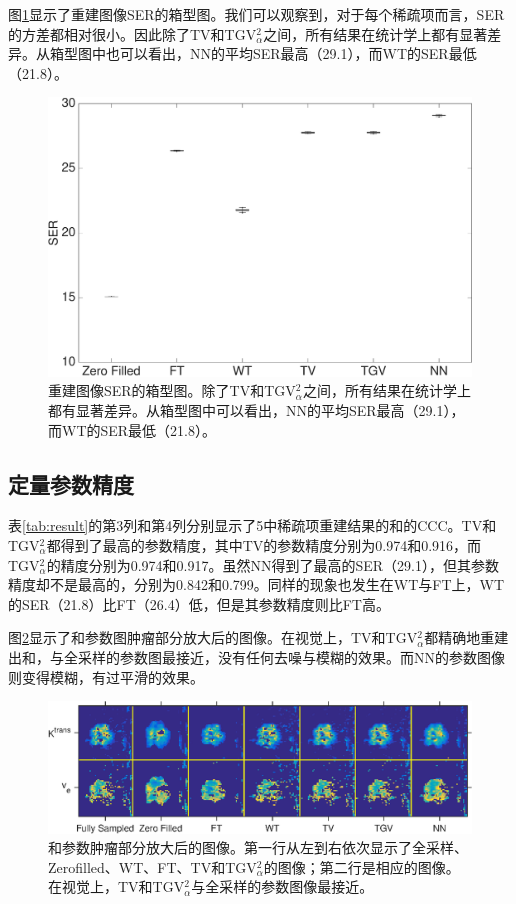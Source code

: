 图\ref{fig:boxplot}显示了重建图像SER的箱型图。我们可以观察到，对于每个稀疏项而言，SER的方差都相对很小。因此除了TV和TGV$_\alpha^2$之间，所有结果在统计学上都有显著差异。从箱型图中也可以看出，NN的平均SER最高（29.1），而WT的SER最低（21.8）。

\begin{figure}[htbp]
\centerline{
    \includegraphics[width=1\textwidth]{img/qetsr/figure3.eps}
}
\caption{
重建图像SER的箱型图。除了TV和TGV$_\alpha^2$之间，所有结果在统计学上都有显著差异。从箱型图中可以看出，NN的平均SER最高（29.1），而WT的SER最低（21.8）。
}
\label{fig:boxplot}
\end{figure}

\subsection{定量参数精度}
表\ref{tab:result}的第3列和第4列分别显示了5中稀疏项重建结果的\kt 和\Ve 的CCC。TV和TGV$_\alpha^2$都得到了最高的参数精度，其中TV的参数精度分别为0.974和0.916，而TGV$_\alpha^2$的精度分别为0.974和0.917。虽然NN得到了最高的SER（29.1），但其参数精度却不是最高的，分别为0.842和0.799。同样的现象也发生在WT与FT上，WT的SER（21.8）比FT（26.4）低，但是其参数精度则比FT高。

图\ref{fig:zoom}显示了\kt 和\Ve 参数图肿瘤部分放大后的图像。在视觉上，TV和TGV$_\alpha^2$都精确地重建出\kt 和\Ve，与全采样的参数图最接近，没有任何去噪与模糊的效果。而NN的参数图像则变得模糊，有过平滑的效果。

\begin{figure}[htbp]
\centerline{\includegraphics[width=1.0\textwidth]{img/qetsr/figure4.eps}}
\centering
\caption{
\kt 和\Ve 参数肿瘤部分放大后的图像。第一行从左到右依次显示了全采样、Zerofilled、WT、FT、TV和TGV$_{\alpha}^2$的\kt 图像；第二行是相应的\Ve 图像。在视觉上，TV和TGV$_{\alpha}^2$与全采样的参数图像最接近。
}
\label{fig:zoom}
\end{figure}

